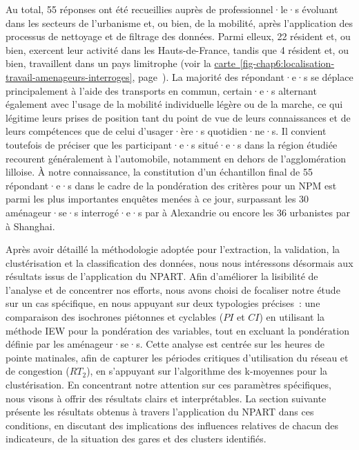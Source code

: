 \begin{refsegment}
Au total, 55 réponses ont été recueillies auprès de professionnel·le·s évoluant dans les secteurs de l'urbanisme et, ou bien, de la mobilité, après l'application des processus de nettoyage et de filtrage des données. Parmi elleux, 22 résident et, ou bien, exercent leur activité dans les Hauts-de-France, tandis que 4 résident et, ou bien, travaillent dans un pays limitrophe (voir la \hyperref[fig-chap6:localisation-travail-amenageurs-interroges]{carte~\ref{fig-chap6:localisation-travail-amenageurs-interroges}}, page~\pageref{fig-chap6:localisation-travail-amenageurs-interroges}). La majorité des répondant·e·s se déplace principalement à l'aide des transports en commun, certain·e·s alternant également avec l'usage de la mobilité individuelle légère ou de la marche, ce qui légitime leurs prises de position tant du point de vue de leurs connaissances et de leurs compétences que de celui d’usager·ère·s quotidien·ne·s. Il convient toutefois de préciser que les participant·e·s situé·e·s dans la région étudiée recourent généralement à l’automobile, notamment en dehors de l’agglomération lilloise. À notre connaissance, la constitution d'un échantillon final de 55 répondant·e·s dans le cadre de la pondération des critères pour un \acrshort{NPM} est parmi les plus importantes enquêtes menées à ce jour, surpassant les 30 aménageur·se·s interrogé·e·s par \textcolor{blue}{\textcite[247]{ibrahim_measuring_2023}} à Alexandrie ou encore les 36 urbanistes par \textcolor{blue}{\textcite[274]{li_transit_2019}} à Shanghai.%

Après avoir détaillé la méthodologie adoptée pour l'extraction, la validation, la clustérisation et la classification des données, nous nous intéressons désormais aux résultats issus de l'application du \acrshort{NPART}. Afin d'améliorer la lisibilité de l'analyse et de concentrer nos efforts, nous avons choisi de focaliser notre étude sur un cas spécifique, en nous appuyant sur deux typologies précises~: une comparaison des isochrones piétonnes et cyclables (\(PI\) et \(CI\)) en utilisant la méthode \acrshort{IEW} pour la pondération des variables, tout en excluant la pondération définie par les aménageur·se·s. Cette analyse est centrée sur les heures de pointe matinales, afin de capturer les périodes critiques d'utilisation du réseau et de congestion (\(RT_{2}\)), en s'appuyant sur l'algorithme des k-moyennes pour la clustérisation. En concentrant notre attention sur ces paramètres spécifiques, nous visons à offrir des résultats clairs et interprétables. La section suivante présente les résultats obtenus à travers l'application du \acrshort{NPART} dans ces conditions, en discutant des implications des influences relatives de chacun des indicateurs, de la situation des gares et des clusters identifiés.%


\end{refsegment}

